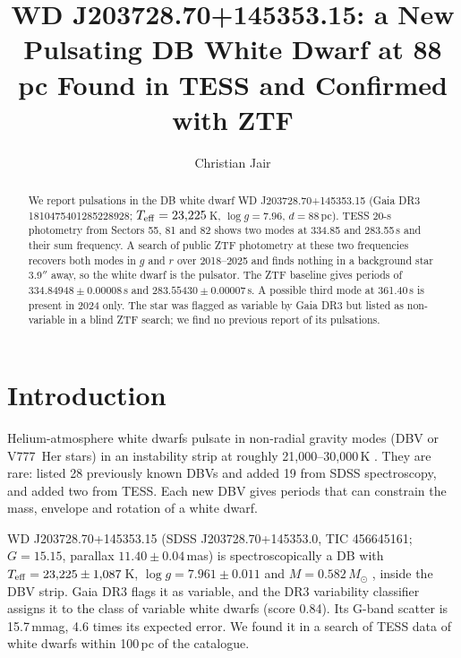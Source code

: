 \documentclass[RNAAS]{aastex631}
\begin{document}
\title{WD J203728.70+145353.15: a New Pulsating DB White Dwarf at 88 pc Found in TESS and Confirmed with ZTF}

\author{Christian Jair}

\begin{abstract}
We report pulsations in the DB white dwarf WD J203728.70+145353.15 (Gaia DR3 1810475401285228928; $T_{\rm eff}=23{,}225$\,K,
$\log g=7.96$, $d=88$\,pc). TESS 20-s photometry from Sectors 55, 81 and 82 shows two modes at 334.85 and 283.55\,s and
their sum frequency. A search of public ZTF photometry at these two frequencies recovers both modes in $g$ and $r$
over 2018--2025 and finds nothing in a background star 3.9$''$ away, so the white dwarf is the pulsator. The ZTF
baseline gives periods of $334.84948\pm0.00008$\,s and $283.55430\pm0.00007$\,s. A possible third mode at 361.40\,s is
present in 2024 only. The star was flagged as variable by Gaia DR3 but listed as non-variable in a blind ZTF search;
we find no previous report of its pulsations.
\end{abstract}


\section{Introduction}
Helium-atmosphere white dwarfs pulsate in non-radial gravity modes (DBV or V777~Her stars) in an instability strip
at roughly 21{,}000--30{,}000\,K \citep{corsico2022}. They are rare: \citet{vanderbosch2022} listed 28 previously
known DBVs and added 19 from SDSS spectroscopy, and \citet{corsico2022} added two from TESS. Each new DBV gives
periods that can constrain the mass, envelope and rotation of a white dwarf.

WD J203728.70+145353.15 (SDSS J203728.70+145353.0, TIC 456645161; $G=15.15$, parallax $11.40\pm0.04$\,mas) is
spectroscopically a DB with $T_{\rm eff}=23{,}225\pm1{,}087$\,K, $\log g=7.961\pm0.011$ and $M=0.582\,M_\odot$
\citep{kilic2020}, inside the DBV strip. Gaia DR3 flags it as variable, and the DR3 variability classifier
\citep{rimoldini2023} assigns it to the class of variable white dwarfs (score 0.84). Its G-band scatter is 15.7\,mmag,
4.6 times its expected error. We found it in a search of TESS data of white dwarfs within 100\,pc of the
\citet{gentilefusillo2021} catalogue.
\end{document}
